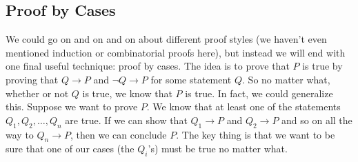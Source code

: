 \documentclass[10pt,]{book}
\theoremstyle{plain}
\theoremstyle{definition}
\theoremstyle{definition}
\theoremstyle{definition}
\numberwithin{equation}{chapter}
\def\imp{\rightarrow}
\begin{document}
\subsection[Proof by Cases]{Proof by Cases}\label{subsection-36}

%
\par

We could go on and on and on about different proof styles (we haven't even mentioned induction or combinatorial proofs here), but instead we will end with one final useful technique: proof by cases. The idea is to prove that \(P\) is true by proving that \(Q \imp P\) and \(\neg Q \imp P\) for some statement \(Q\). So no matter what, whether or not \(Q\) is true, we know that \(P\) is true. In fact, we could generalize this. Suppose we want to prove \(P\). We know that at least one of the statements \(Q_1, Q_2, \ldots, Q_n\) are true. If we can show that \(Q_1 \imp P\) and \(Q_2 \imp P\) and so on all the way to \(Q_n \imp P\), then we can conclude \(P\). The key thing is that we want to be sure that one of our cases (the \(Q_i\)'s) must be true no matter what.
%
\par
\end{document}
